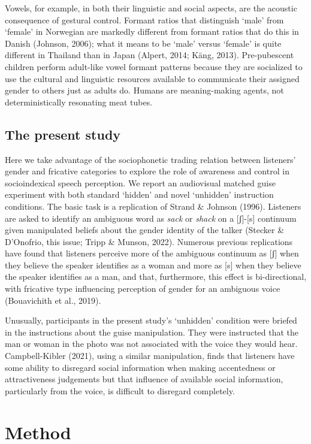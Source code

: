 \documentclass[
  letterpaper,
  DIV=11,
  numbers=noendperiod]{scrartcl}
\begin{document}
Vowels, for example, in both their linguistic and social aspects, are
the acoustic consequence of gestural control. Formant ratios that
distinguish `male' from `female' in Norwegian are markedly different
from formant ratios that do this in Danish (Johnson, 2006); what it
means to be `male' versus `female' is quite different in Thailand than
in Japan (Alpert, 2014; Käng, 2013). Pre-pubescent children perform
adult-like vowel formant patterns because they are socialized to use the
cultural and linguistic resources available to communicate their
assigned gender to others just as adults do. Humans are meaning-making
agents, not deterministically resonating meat tubes.

\subsection{The present study}\label{the-present-study}

Here we take advantage of the sociophonetic trading relation between
listeners' gender and fricative categories to explore the role of
awareness and control in socioindexical speech perception. We report an
audiovisual matched guise experiment with both standard `hidden' and
novel `unhidden' instruction conditions. The basic task is a replication
of Strand \& Johnson (1996). Listeners are asked to identify an
ambiguous word as \emph{sack} or \emph{shack} on a {[}ʃ{]}-{[}s{]}
continuum given manipulated beliefs about the gender identity of the
talker (Stecker \& D'Onofrio, this issue; Tripp \& Munson, 2022).
Numerous previous replications have found that listeners perceive more
of the ambiguous continuum as {[}ʃ{]} when they believe the speaker
identifies as a woman and more as {[}s{]} when they believe the speaker
identifies as a man, and that, furthermore, this effect is
bi-directional, with fricative type influencing perception of gender for
an ambiguous voice (Bouavichith et al., 2019).

Unusually, participants in the present study's `unhidden' condition were
briefed in the instructions about the guise manipulation. They were
instructed that the man or woman in the photo was not associated with
the voice they would hear. Campbell-Kibler (2021), using a similar
manipulation, finds that listeners have some ability to disregard social
information when making accentedness or attractiveness judgements but
that influence of available social information, particularly from the
voice, is difficult to disregard completely.

\section{Method}\label{sec-method}
\end{document}
